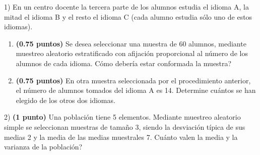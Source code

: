 
1) En un centro docente la tercera parte de los alumnos estudia el idioma A, la mitad el idioma B y el resto el idioma C (cada alumno estudia sólo uno de estos idiomas).
\begin{enumerate}[label=\alph*)]
\item \textbf{(0.75 puntos)} Se desea seleccionar una muestra de 60 alumnos, mediante muestreo aleatorio estratificado con afijación proporcional al número de los alumnos de cada idioma. \textquestiondown{}Cómo debería estar conformada la muestra?
\item \textbf{(0.75 puntos)} En otra muestra seleccionada por el procedimiento anterior, el número de alumnos tomados del idioma A es 14. Determine cuántos se han elegido de los otros dos idiomas.
\end{enumerate}
2) \textbf{(1 punto)} Una población tiene 5 elementos. Mediante muestreo aleatorio simple se seleccionan muestras de tamaño 3, siendo la desviación típica de sus medias 2 y la media de las medias muestrales 7. \textquestiondown{}Cuánto valen la media y la varianza de la población?
